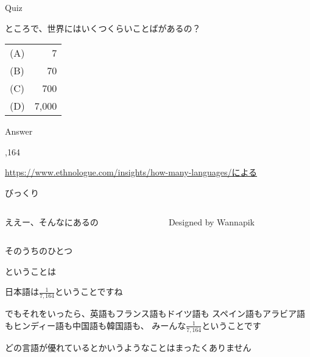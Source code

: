 \documentclass[
  ignorenonframetext,
  aspectratio=169,
  xcolor=dvipsnames]{beamer}
\begin{document}
\begin{frame}{Quiz}
\label{quiz}
\Large

ところで、世界にはいくつくらいことばがあるの？

\pause

\vfill

\centering
\begin{tabular}{lr}
(A) &7\\\pause
(B) &70\\\pause
(C) &700\\\pause
(D) &7,000
\end{tabular}

\vfill
\end{frame}

\begin{frame}{Answer}
\label{answer}
\Huge
\vfill

,164

\vfill

\raggedleft
\scriptsize

\url{https://www.ethnologue.com/insights/how-many-languages/による}
\end{frame}

\begin{frame}{びっくり}
\label{ux3073ux3063ux304fux308a}
\Large

\begin{columns}
    \begin{column}{0.475\textwidth}
      ええー、そんなにあるの
    \end{column}
    \begin{column}{0.475\textwidth}
            {\tiny Designed by Wannapik}
      \end{column}
  \end{columns}
\end{frame}

\begin{frame}{そのうちのひとつ}
\label{ux305dux306eux3046ux3061ux306eux3072ux3068ux3064}
\Large

ということは\pause

日本語は\Huge \phantom{0}\(\frac{1}{7,164}\)\phantom{0}\Large ということですね

\vfill
\pause

でもそれをいったら、\pause 英語もフランス語もドイツ語も\pause
スペイン語もアラビア語もヒンディー語も\pause 中国語も韓国語も、\pause
みーんな\Huge\phantom{0}\(\frac{1}{7,164}\)\phantom{0}\Large ということです

\vfill
\pause

どの言語が優れているとかいうようなことはまったくありません
\end{frame}
\end{document}
